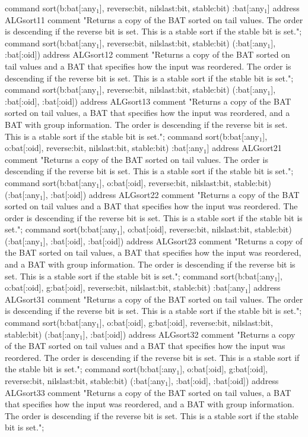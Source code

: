 \documentclass[11pt]{article}
\begin{document}
command sort(b:bat[:any\(_{\text{1}}\)], reverse:bit, nilslast:bit, stable:bit) :bat[:any\(_{\text{1}}\)]
address ALGsort11
comment "Returns a copy of the BAT sorted on tail values.
         The order is descending if the reverse bit is set.
		 This is a stable sort if the stable bit is set.";
command sort(b:bat[:any\(_{\text{1}}\)], reverse:bit, nilslast:bit, stable:bit) (:bat[:any\(_{\text{1}}\)], :bat[:oid])
address ALGsort12
comment "Returns a copy of the BAT sorted on tail values and a BAT that
         specifies how the input was reordered.
         The order is descending if the reverse bit is set.
		 This is a stable sort if the stable bit is set.";
command sort(b:bat[:any\(_{\text{1}}\)], reverse:bit, nilslast:bit, stable:bit) (:bat[:any\(_{\text{1}}\)], :bat[:oid], :bat[:oid])
address ALGsort13
comment "Returns a copy of the BAT sorted on tail values, a BAT that specifies
         how the input was reordered, and a BAT with group information.
         The order is descending if the reverse bit is set.
		 This is a stable sort if the stable bit is set.";
command sort(b:bat[:any\(_{\text{1}}\)], o:bat[:oid], reverse:bit, nilslast:bit, stable:bit) :bat[:any\(_{\text{1}}\)]
address ALGsort21
comment "Returns a copy of the BAT sorted on tail values.
         The order is descending if the reverse bit is set.
		 This is a stable sort if the stable bit is set.";
command sort(b:bat[:any\(_{\text{1}}\)], o:bat[:oid], reverse:bit, nilslast:bit, stable:bit) (:bat[:any\(_{\text{1}}\)], :bat[:oid])
address ALGsort22
comment "Returns a copy of the BAT sorted on tail values and a BAT that
         specifies how the input was reordered.
         The order is descending if the reverse bit is set.
		 This is a stable sort if the stable bit is set.";
command sort(b:bat[:any\(_{\text{1}}\)], o:bat[:oid], reverse:bit, nilslast:bit, stable:bit) (:bat[:any\(_{\text{1}}\)], :bat[:oid], :bat[:oid])
address ALGsort23
comment "Returns a copy of the BAT sorted on tail values, a BAT that specifies
         how the input was reordered, and a BAT with group information.
         The order is descending if the reverse bit is set.
		 This is a stable sort if the stable bit is set.";
command sort(b:bat[:any\(_{\text{1}}\)], o:bat[:oid], g:bat[:oid], reverse:bit, nilslast:bit, stable:bit) :bat[:any\(_{\text{1}}\)]
address ALGsort31
comment "Returns a copy of the BAT sorted on tail values.
         The order is descending if the reverse bit is set.
		 This is a stable sort if the stable bit is set.";
command sort(b:bat[:any\(_{\text{1}}\)], o:bat[:oid], g:bat[:oid], reverse:bit, nilslast:bit, stable:bit) (:bat[:any\(_{\text{1}}\)], :bat[:oid])
address ALGsort32
comment "Returns a copy of the BAT sorted on tail values and a BAT that
         specifies how the input was reordered.
         The order is descending if the reverse bit is set.
		 This is a stable sort if the stable bit is set.";
command sort(b:bat[:any\(_{\text{1}}\)], o:bat[:oid], g:bat[:oid], reverse:bit, nilslast:bit, stable:bit) (:bat[:any\(_{\text{1}}\)], :bat[:oid], :bat[:oid])
address ALGsort33
comment "Returns a copy of the BAT sorted on tail values, a BAT that specifies
         how the input was reordered, and a BAT with group information.
         The order is descending if the reverse bit is set.
		 This is a stable sort if the stable bit is set.";
\end{document}
